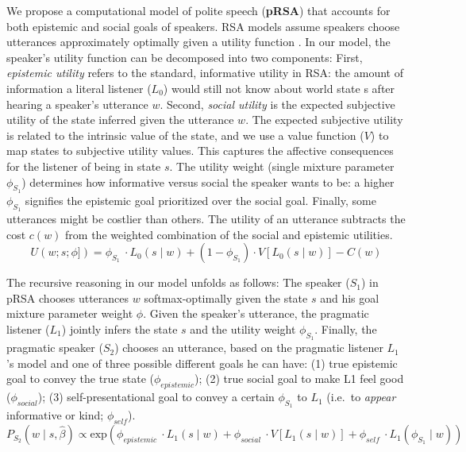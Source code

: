 \documentclass[12pt]{article}
\begin{document}
We propose a computational model of polite speech (\textbf{pRSA}) that
accounts for both epistemic and social goals of speakers. RSA models
assume speakers choose utterances approximately optimally given a
utility function \cite{goodman2013}. In our model, the
speaker's utility function can be decomposed into two components: First,
\emph{epistemic utility} refers to the standard, informative utility in
RSA: the amount of information a literal listener (\(L_0\)) would still
not know about world state s after hearing a speaker's utterance \(w\).
Second, \emph{social utility} is the expected subjective utility of the
state inferred given the utterance \(w\). The expected subjective
utility is related to the intrinsic value of the state, and we use a
value function (\(V\)) to map states to subjective utility values. This
captures the affective consequences for the listener of being in state
\(s\). The utility weight (single mixture parameter \(\phi_{S_1}\))
determines how informative versus social the speaker wants to be: a
higher \(\phi_{S_1}\) signifies the epistemic goal prioritized over the
social goal. Finally, some utterances might be costlier than others. The
utility of an utterance subtracts the cost \(c(w)\) from the weighted
combination of the social and epistemic utilities.
\[U(w; s; \phi]) = \phi_{S_1}\ \cdot L_0(s \mid w) + 
(1 - \phi_{S_1}) \cdot V[L_0(s \mid w)]  - C(w)\]

The recursive reasoning in our model unfolds as follows: The speaker
(\(S_1\)) in pRSA chooses utterances \(w\) softmax-optimally given the
state \(s\) and his goal mixture parameter weight \(\phi\). Given the
speaker's utterance, the pragmatic listener (\(L_1\)) jointly infers the
state \(s\) and the utility weight \(\phi_{S_1}\). Finally, the
pragmatic speaker (\(S_2\)) chooses an utterance, based on the pragmatic
listener \(L_1\)'s model and one of three possible different goals he
can have: (1) true epistemic goal to convey the true state
(\(\phi_{epistemic}\)); (2) true social goal to make L1 feel good
(\(\phi_{social}\)); (3) self-presentational goal to convey a certain
\(\phi_{S_1}\) to \(L_1\) (i.e.~to \emph{appear} informative or kind;
\(\phi_{self}\)). \[P_{S_2}(w \mid s, \hat{\beta})\propto 
\mathrm{exp}( \phi_{epistemic}\ \cdot L_1(s \mid w) +
\phi_{social}\ \cdot V[L_1(s \mid w)] + 
\phi_{self}\ \cdot L_1(\phi_{S_1} \mid w) )\]
\end{document}
